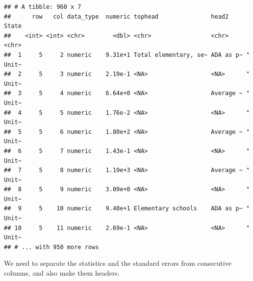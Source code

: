 \documentclass[12pt,letterpaperpaper,openany]{book}
\newenvironment{Shaded}{\begin{snugshade}}{\end{snugshade}}
\newcommand{\DataTypeTok}[1]{\textcolor[rgb]{0.13,0.29,0.53}{#1}}
\newcommand{\DecValTok}[1]{\textcolor[rgb]{0.00,0.00,0.81}{#1}}
\newcommand{\KeywordTok}[1]{\textcolor[rgb]{0.13,0.29,0.53}{\textbf{#1}}}
\newcommand{\NormalTok}[1]{#1}
\newcommand{\OperatorTok}[1]{\textcolor[rgb]{0.81,0.36,0.00}{\textbf{#1}}}
\newcommand{\StringTok}[1]{\textcolor[rgb]{0.31,0.60,0.02}{#1}}
\begin{document}
\begin{verbatim}
## # A tibble: 960 x 7
##      row   col data_type  numeric tophead               head2     State    
##    <int> <int> <chr>        <dbl> <chr>                 <chr>     <chr>    
##  1     5     2 numeric    9.31e+1 Total elementary, se~ ADA as p~ "   Unit~
##  2     5     3 numeric    2.19e-1 <NA>                  <NA>      "   Unit~
##  3     5     4 numeric    6.64e+0 <NA>                  Average ~ "   Unit~
##  4     5     5 numeric    1.76e-2 <NA>                  <NA>      "   Unit~
##  5     5     6 numeric    1.80e+2 <NA>                  Average ~ "   Unit~
##  6     5     7 numeric    1.43e-1 <NA>                  <NA>      "   Unit~
##  7     5     8 numeric    1.19e+3 <NA>                  Average ~ "   Unit~
##  8     5     9 numeric    3.09e+0 <NA>                  <NA>      "   Unit~
##  9     5    10 numeric    9.40e+1 Elementary schools    ADA as p~ "   Unit~
## 10     5    11 numeric    2.69e-1 <NA>                  <NA>      "   Unit~
## # ... with 950 more rows
\end{verbatim}

We need to separate the statistics and the standard errors from consecutive columns, and
also make them headers.

\begin{Shaded}
\end{Shaded}
\end{document}
